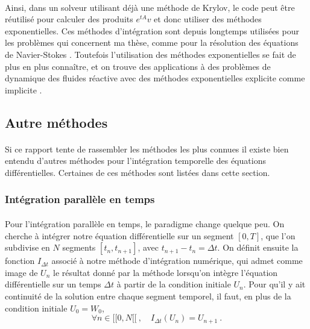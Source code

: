     \paragraph{}
    Ainsi, dans un solveur utilisant déjà une méthode de Krylov, le code peut être réutilisé pour calculer des produits $e^{tA}v$ et donc utiliser des méthodes exponentielles.
    Ces méthodes d'intégration sont depuis longtemps utilisées pour les problèmes qui concernent ma thèse, comme pour la résolution des équations de Navier-Stokes \cite{EdwardsTuckermanFriesnerEtAl1994}.
    Toutefois l'utilisation des méthodes exponentielles se fait de plus en plus connaître, et on trouve des applications à des problèmes de dynamique des fluides réactive avec des méthodes exponentielles explicite \cite{BhattKhaliqWade2018} comme implicite \cite{NieZhangZhao2006}.


  \subsection{Autre méthodes}

    \paragraph{}
    Si ce rapport tente de rassembler les méthodes les plus connues il existe bien entendu d'autres méthodes pour l'intégration temporelle des équations différentielles.
    Certaines de ces méthodes sont listées dans cette section.

    \subsubsection{Intégration parallèle en temps}

      \paragraph{}
      Pour l'intégration parallèle en temps, le paradigme change quelque peu.
      On cherche à intégrer notre équation différentielle sur un segment $\left[0, T\right]$, que l'on subdivise en $N$ segments $\left[t_n, t_{n+1}\right]$, avec $t_{n+1} - t_n = \Delta t$.
      On définit ensuite la fonction $I_{\Delta t}$ associé à notre méthode d'intégration numérique, qui admet comme image de $U_n$ le résultat donné par la méthode lorsqu'on intègre l'équation différentielle sur un temps $\Delta t$ à partir de la condition initiale $U_n$.
      Pour qu'il y ait continuité de la solution entre chaque segment temporel, il faut, en plus de la condition initiale $U_0 = W_0$,
      \[\forall n\in  [\![0, N[\![\ ,\quad I_{\Delta t}\left(U_n\right) = U_{n+1}\ .\]

